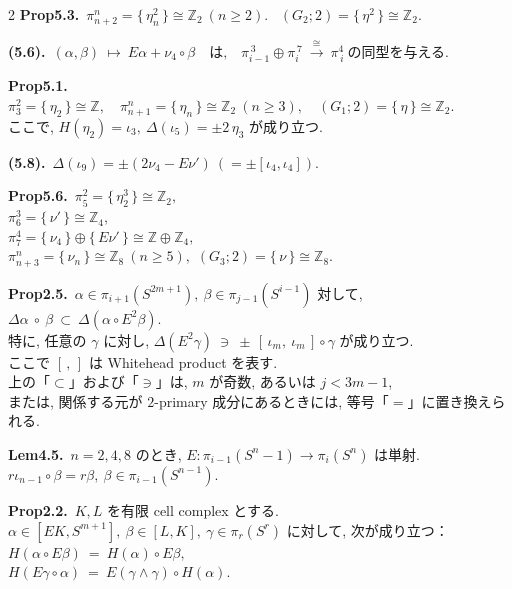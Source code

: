 \documentclass[10pt, leqno]{ltjsarticle}
\newcommand{\gen}[1]{\{\,#1\,\}}       %
\newcommand{\pis}[2]{\pi_{#1}(#2)}       %
\numberwithin{equation}{section}
\theoremstyle{plain}
\theoremstyle{definition}
\theoremstyle{remark}
\begin{document}
\begin{paracol}{2}
\noindent
\textbf{Prop5.3.}\
\(\pi^{n}_{n+2}=\gen{\eta_n^{2}}\cong \mathbb Z_2\ (n\ge2).\) \
\((G_2;2)=\gen{\eta^{2}}\cong \mathbb Z_2 .\)

\noindent
\textbf{(5.6).}\
\((\alpha,\beta)\ \longmapsto\ E\alpha+\nu_{4}\circ\beta
\quad\text{は,}\quad
\pi^{\,3}_{i-1}\oplus \pi^{\,7}_{i}\ \xrightarrow{\ \cong\ }\ \pi_{\,i}^{4}
\ \text{の同型を与える. }\)

\noindent
\textbf{Prop5.1.}\
\(\pi^{2}_{3}=\gen{\eta_2}\cong\mathbb Z,\quad
\pi^{n}_{n+1}=\gen{\eta_n}\cong\mathbb Z_2\ (n\ge3),\quad
(G_1;2)=\gen{\eta}\cong\mathbb Z_2.\) \\
ここで, 
\(H(\eta_2)=\iota_3,\ \Delta(\iota_5)=\pm 2\,\eta_3\) が成り立つ. 

\noindent
\textbf{(5.8).}\
\(\Delta(\iota_9)=\pm(2\nu_4-E\nu')  \ (=\pm[\iota_4, \iota_4]) .\)

\noindent
\textbf{Prop5.6.}\
\(\pi^{2}_{5}=\gen{\eta_{2}^{3}}\cong \mathbb Z_{2},\) \\
\(\pi^{3}_{6}=\gen{\nu'}\cong \mathbb Z_{4},\) \\
\(\pi^{4}_{7}=\gen{\nu_{4}}\oplus \gen{E\nu'}\cong \mathbb Z\oplus\mathbb Z_{4},\) \\
\(\pi^{n}_{n+3}=\gen{\nu_{n}}\cong \mathbb Z_{8}\ (n\ge5),\)\qquad
\((G_{3};2)=\gen{\nu}\cong \mathbb Z_{8}.\)

\noindent
\textbf{Prop2.5.}\
$\alpha\in\pi_{i+1}(S^{2m+1}), \ \beta\in \pi_{j-1}(S^{i-1})$ 対して, 
\(
\Delta\alpha\ \circ\ \beta\ \subset\ \Delta(\alpha\circ E^2\beta).
\)\\
特に, 任意の $\gamma$ に対し,
\(
\Delta(E^2\gamma)\ \ni\ \pm\,[\,\iota_m,\ \iota_m\,]\circ\gamma
\)
が成り立つ. \\
ここで $[\, ,\,]$ は Whitehead product を表す. \\
上の「$\subset$」および「$\ni$」は, $m$ が奇数, 
あるいは $j<3m-1$, \\
または, 関係する元が \(2\)-primary 成分にあるときには, 
等号「$=$」に置き換えられる. 

\noindent
\textbf{Lem4.5.}\
\(n=2,4,8\) のとき, 
\(E:\pis{i-1}{S^n-1}\to\pis{i}{S^n}\) は単射.\\ 
\(r\iota_{n-1}\circ\beta = r\beta,\ \beta\in\pis{i-1}{S^{n-1}}\).

\noindent
\textbf{Prop2.2.}\
$K,L$ を有限 cell complex とする. \\
$\alpha\in[EK, S^{m+1}], \ \beta\in[L,K], \ \gamma\in\pi_r(S^r)$ 
に対して, 次が成り立つ：\\
\(
H(\alpha\circ E\beta)\ =\ H(\alpha)\circ E\beta,
\)\\
\(
H(E\gamma\circ\alpha)\ =\ E(\gamma\wedge\gamma)\circ H(\alpha).
\)


\end{paracol}
\end{document}
